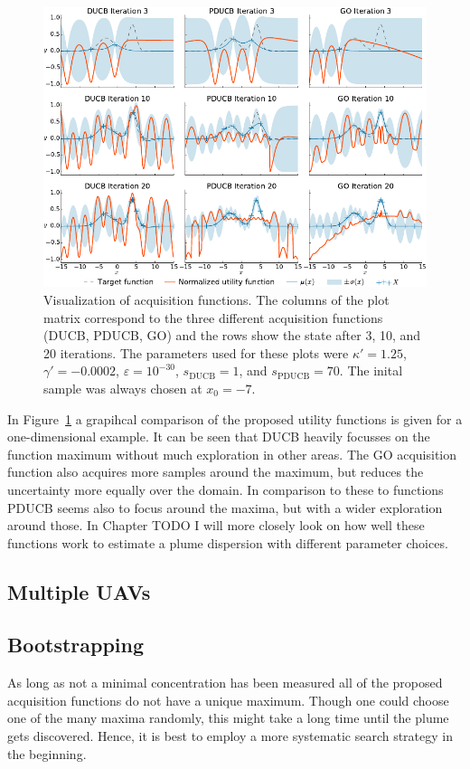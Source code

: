 \documentclass[11pt,a4paper,twoside,BCOR=15mm]{scrreprt}
\newcommand{\ped}[1]{_{\mathrm{#1}}}
\begin{document}
\begin{figure}
    \centering
    \includegraphics{plots/acqfns}
    \caption{Visualization of acquisition functions. The columns of the plot 
        matrix correspond to the three different acquisition functions (DUCB, 
        PDUCB, GO) and the rows show the state after 3, 10, and 20 iterations.  
        The parameters used for these plots were $\kappa' = 1.25$, $\gamma' 
        = -0.0002$, $\varepsilon = 10^{-30}$, $s\ped{DUCB} = 1$, and 
        $s\ped{PDUCB} = 70$. The inital sample was always chosen at $x_0 
        = -7$.}\label{fig:acqfns}
\end{figure}
In Figure~\ref{fig:acqfns} a grapihcal comparison of the proposed utility 
functions is given for a one-dimensional example. It can be seen that DUCB 
heavily focusses on the function maximum without much exploration in other 
areas. The GO acquisition function also acquires more samples around the 
maximum, but reduces the uncertainty more equally over the domain. In comparison 
to these to functions PDUCB seems also to focus around the maxima, but with 
a wider exploration around those. In Chapter TODO I will more closely look on 
how well these functions work to estimate a plume dispersion with different 
parameter choices.

\subsection{Multiple UAVs}

\subsection{Bootstrapping}
As long as not a minimal concentration has been measured all of the proposed 
acquisition functions do not have a unique maximum. Though one could choose one 
of the many maxima randomly, this might take a long time until the plume gets 
discovered. Hence, it is best to employ a more systematic search strategy in the 
beginning.
\end{document}
